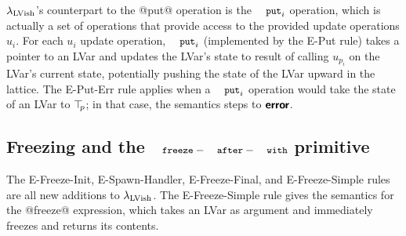 $\lambda_{\textrm{LVish}}$'s counterpart to the @put@ operation is the $\PUTi$
operation, which is actually a set of operations that provide access
to the provided update operations $u_i$.  For each $u_i$ update
operation, $\PUTi$ (implemented by the {\sc E-Put} rule) takes a
pointer to an LVar and updates the LVar's state to result of calling
$u_{p_i}$ on the LVar's current state, potentially pushing the state
of the LVar upward in the lattice.  The {\sc E-Put-Err} rule applies
when a $\PUTi$ operation would take the state of an LVar to $\top\hspace{-0.85mm}_{p}$;
in that case, the semantics steps to $\textbf{\textsf{error}}$.

\subsection{Freezing and the $\FAW$ primitive}\label{subsection:quasi-freezing}

The {\sc E-Freeze-Init}, {\sc E-Spawn-Handler}, {\sc E-Freeze-Final},
and {\sc E-Freeze-Simple} rules are all new additions to
$\lambda_{\textrm{LVish}}$.  The {\sc E-Freeze-Simple} rule gives the semantics
for the @freeze@ expression, which takes an LVar as argument and
immediately freezes and returns its contents.

